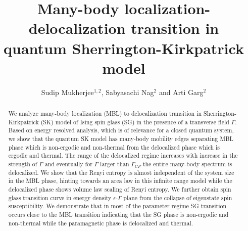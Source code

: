 \documentclass[prl,aps,twocolumn,floats,nofootinbib]{revtex4}
\begin{document}
\renewcommand{\ni}{{\noindent}}
\newcommand{\dprime}{{\prime\prime}}
\newcommand{\be}{\begin{equation}}
\newcommand{\ee}{\end{equation}}
\newcommand{\bea}{\begin{eqnarray}} 
\newcommand{\eea}{\end{eqnarray}}
\newcommand{\la}{\langle}
\newcommand{\ra}{\rangle} 
\newcommand{\dg}{\dagger}
\newcommand\lbs{\left[}
\newcommand\rbs{\right]}
\newcommand\lbr{\left(}
\newcommand\rbr{\right)}
\newcommand\f{\frac}
\newcommand\e{\epsilon}
\newcommand\ua{\uparrow}
\newcommand\da{\downarrow}
\title{Many-body localization-delocalization transition in quantum Sherrington-Kirkpatrick model}
\author{Sudip Mukherjee$^{1,2}$, Sabyasachi Nag$^{2}$ and Arti Garg$^{2}$} 
\vspace{0.2cm}
\begin{abstract}
\vspace{0.3cm}
We analyze many-body localization (MBL) to delocalization transition in Sherrington-Kirkpatrick (SK) model of Ising spin glass (SG) in the presence of a transverse field $\Gamma$. Based on energy resolved analysis, which is of relevance for a closed quantum system, we show that the quantum SK model has many-body mobility edges separating MBL phase which is non-ergodic and non-thermal from the delocalized phase which is ergodic and thermal. The range of the delocalized regime increases with increase in the strength of $\Gamma$ and eventually for $\Gamma$ larger than $\Gamma_{CP}$ the entire many-body spectrum is delocalized. We show that the Renyi entropy is almost independent of the system size in the MBL phase, hinting towards an area law in this infinite range model while the delocalized phase shows volume law scaling of Renyi entropy. We further obtain spin glass transition curve in energy density $\epsilon$-$\Gamma$ plane from the collapse of eigenstate spin susceptibility. We demonstrate that in most of the parameter regime SG transition occurs close to the MBL transition indicating that the SG phase is non-ergodic and non-thermal while the paramagnetic phase is delocalized and thermal.  
\vspace{0.cm}
\end{abstract} 
\maketitle
\end{document}

